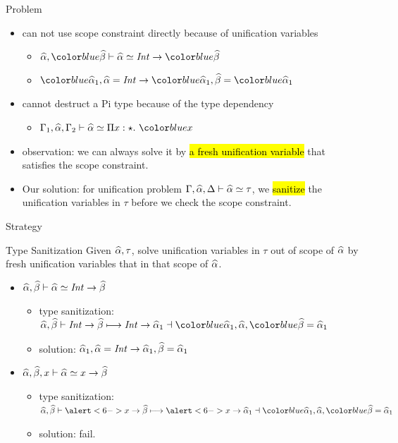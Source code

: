 \documentclass{beamer}
\begin{document}
\begin{frame}{Problem}
  \begin{itemize}
    \item can not use scope constraint directly because of unification variables
      \begin{itemize}
        \item $\genA, \hl{\genB} \byuni \genA \uni \Int \to \hl{\genB}$
        \item $\hl{\genA_1}, \genA = \Int \to \hl{\genA_1}, \genB = \hl{\genA_1}$
      \end{itemize}
    \item cannot destruct a Pi type because of the type dependency
      \begin{itemize}
      \item $\tctx_1, \genA, \tctx_2 \byuni \genA \uni \bpi x \star \hl{x}$
      \end{itemize}
    \item<2-> observation: we can always solve it by \hl{a fresh unification
      variable} that satisfies the scope constraint.
    \item<3-> Our solution:
        for unification problem
        $\Gamma, \widehat{\alpha}, \Delta \vdash \widehat{\alpha} \simeq \tau$,
        we \hl{sanitize} the unification variables in $\tau$ before we check the
        scope constraint.
  \end{itemize}
\end{frame}

\begin{frame}{Strategy}
  \begin{block}{Type Sanitization}
    Given $\widehat{\alpha}, \tau$, solve unification variables in $\tau$ out of scope of
    $\widehat{\alpha}$ by fresh unification variables that in that scope of $\widehat{\alpha}$.
  \end{block}
  \begin{itemize}
  \item<3-> $\widehat{\alpha}, \widehat{\beta} \vdash \widehat{\alpha} \simeq \mathit{Int} \to \widehat{\beta}$
    \begin{itemize}
      \item type sanitization: $\genA, \genB \bycg \Int \to \genB \cgto \Int \to
        \genA_1 \dashv \hl{\genA_1}, \genA, \hl{\genB = \genA_1}$
      \item solution: $\widehat{\alpha}_1, \widehat{\alpha} = \mathit{Int} \to \widehat{\alpha}_1, \widehat{\beta} = \widehat{\alpha}_1$
    \end{itemize}
  \item<4-> $\widehat{\alpha}, \widehat{\beta}, x \vdash \widehat{\alpha} \simeq x \to \widehat{\beta}$
    \begin{itemize}
      \item<5-> type sanitization: $\genA, \genB \bycg \alert<6->{x} \to \genB
        \cgto \alert<6->{x} \to
        \genA_1 \dashv \hl{\genA_1}, \genA, \hl{\genB = \genA_1}$
      \item<6-> solution: \alert{fail}.
    \end{itemize}
  \end{itemize}
\end{frame}
\end{document}
